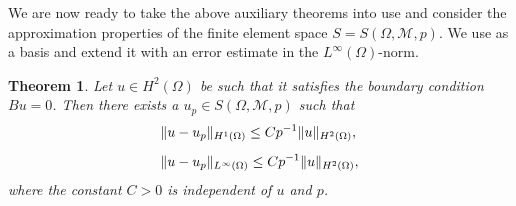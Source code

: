 \documentclass[english, 12pt, a4paper, sci, utf8, a-2b, online]{aaltothesis}
\theoremstyle{definition}
\theoremstyle{plain}
\newtheorem{theorem}{Theorem}[section]
\DeclarePairedDelimiter\norm{\lVert}{\rVert}
\numberwithin{equation}{section}
\begin{document}
We are now ready to take the above auxiliary theorems into use
and consider the approximation properties
of the finite element space $S = S(\Omega, \mathcal{M}, p)$.
We use \cite[Theorem 4.1]{babuskasuri1987} as a basis
and extend it with an error estimate in the $L^{\infty}(\Omega)$-norm.
\begin{theorem}
    \label{thm:approximation_properties_of_S}
    Let $u \in H^2(\Omega)$ be such that it satisfies the boundary condition
    $Bu = 0$. Then there exists a $u_p \in S(\Omega, \mathcal{M}, p)$ such that
    \begin{align}
        \label{eq:approximation_properties_of_S_res1}
        &\norm{u-u_p}_{H^1(\Omega)} \leq C p^{-1} \norm{u}_{H^2(\Omega)}, \\[0.5em]
        \label{eq:approximation_properties_of_S_res2}
        &\norm{u-u_p}_{L^{\infty}(\Omega)} \leq C p^{-1} \norm{u}_{H^2(\Omega)},
    \end{align}
    where the constant $C > 0$ is independent of $u$ and $p$.
\end{theorem}
\end{document}
